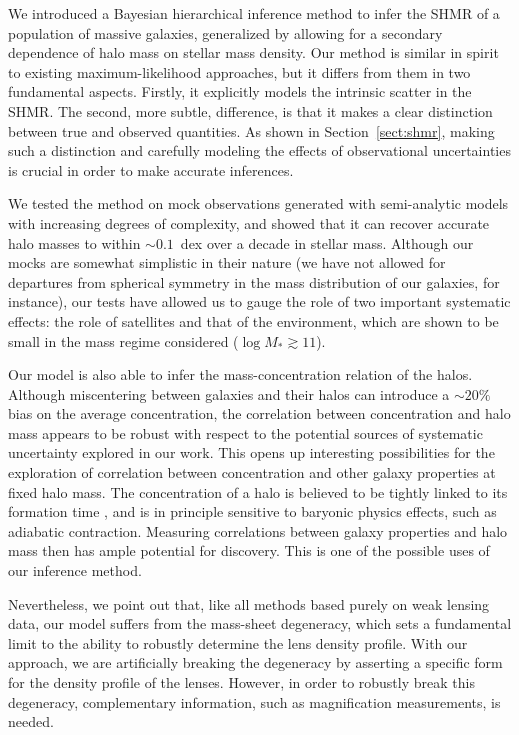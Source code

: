 \documentclass[usenatbib]{mnras}
\def\mstar{M_*}
\def\Sref#1{Section~\ref{#1}\xspace}
\begin{document}

We introduced a Bayesian hierarchical inference method to infer the SHMR of a population of massive galaxies, generalized by allowing for a secondary dependence of halo mass on stellar mass density.
Our method is similar in spirit to existing maximum-likelihood approaches, but it differs from them in two fundamental aspects.
Firstly, it explicitly models the intrinsic scatter in the SHMR.
The second, more subtle, difference, is that it makes a clear distinction between true and observed quantities. As shown in \Sref{sect:shmr}, making such a distinction and carefully modeling the effects of observational uncertainties is crucial in order to make accurate inferences.

We tested the method on mock observations generated with semi-analytic models with increasing degrees of complexity, and showed that it can recover accurate halo masses to within $\sim0.1$~dex over a decade in stellar mass.
Although our mocks are somewhat simplistic in their nature (we have not allowed for departures from spherical symmetry in the mass distribution of our galaxies, for instance), our tests have allowed us to gauge the role of two important systematic effects: the role of satellites and that of the environment, which are shown to be small in the mass regime considered ($\log{\mstar} \gtrsim 11$).

Our model is also able to infer the mass-concentration relation of the halos.
Although miscentering between galaxies and their halos can introduce a $\sim20\%$ bias on the average concentration, the correlation between concentration and halo mass appears to be robust with respect to the potential sources of systematic uncertainty explored in our work.
This opens up interesting possibilities for the exploration of correlation between concentration and other galaxy properties at fixed halo mass.
The concentration of a halo is believed to be tightly linked to its formation time \citep{NFW97, Wec++02, Zha++03}, and is in principle sensitive to baryonic physics effects, such as adiabatic contraction.
Measuring correlations between galaxy properties and halo mass then has ample potential for discovery. This is one of the possible uses of our inference method.

Nevertheless, we point out that, like all methods based purely on weak lensing data, our model suffers from the mass-sheet degeneracy, which sets a fundamental limit to the ability to robustly determine the lens density profile. With our approach, we are artificially breaking the degeneracy by asserting a specific form for the density profile of the lenses. However, in order to robustly break this degeneracy, complementary information, such as magnification measurements, is needed. %
\end{document}

